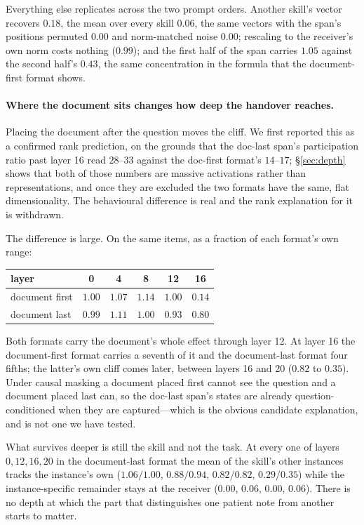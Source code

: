 \documentclass{article}
\begin{document}
Everything else replicates across the two prompt orders. Another skill's vector
recovers $0.18$, the mean over every skill $0.06$, the same vectors with the
span's positions permuted $0.00$ and norm-matched noise $0.00$; rescaling to the
receiver's own norm costs nothing ($0.99$); and the first half of the span
carries $1.05$ against the second half's $0.43$, the same concentration in the
formula that the document-first format shows.



\paragraph{Where the document sits changes how deep the handover reaches.}
Placing the document after the question moves the cliff. We first reported this
as a confirmed rank prediction, on the grounds that the doc-last span's
participation ratio past layer 16 read $28$--$33$ against the doc-first format's
$14$--$17$; \S\ref{sec:depth} shows that both of those numbers are massive
activations rather than representations, and once they are excluded the two
formats have the same, flat dimensionality. The behavioural difference is real
and the rank explanation for it is withdrawn.

The difference is large. On the same items, as a fraction of each format's own
range:
\begin{center}
\begin{tabular}{@{}lccccc@{}}
\toprule
layer & 0 & 4 & 8 & 12 & \textbf{16} \\
\midrule
document first & $1.00$ & $1.07$ & $1.14$ & $1.00$ & $\mathbf{0.14}$ \\
document last  & $0.99$ & $1.11$ & $1.00$ & $0.93$ & $\mathbf{0.80}$ \\
\bottomrule
\end{tabular}
\end{center}

Both formats carry the document's whole effect through layer 12. At layer 16 the
document-first format carries a seventh of it and the document-last format four
fifths; the latter's own cliff comes later, between layers 16 and 20 ($0.82$ to
$0.35$). Under causal masking a document placed first cannot see the question
and a document placed last can, so the doc-last span's states are already
question-conditioned when they are captured---which is the obvious candidate
explanation, and is not one we have tested.

What survives deeper is still the skill and not the task. At every one of layers
$0, 12, 16, 20$ in the document-last format the mean of the skill's other
instances tracks the instance's own ($1.06/1.00$, $0.88/0.94$, $0.82/0.82$,
$0.29/0.35$) while the instance-specific remainder stays at the receiver
($0.00$, $0.06$, $0.00$, $0.06$). There is no depth at which the part that
distinguishes one patient note from another starts to matter.
\end{document}

